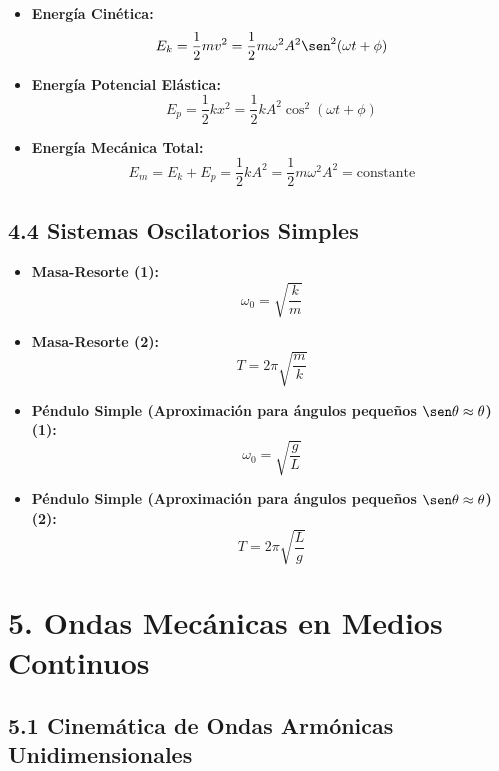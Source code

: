 \documentclass[11pt,a4paper]{article}
\begin{document}
\begin{itemize}
  \item \textbf{Energía Cinética:}
  \[
    E_k = \frac{1}{2} m v^2 = \frac{1}{2} m \omega^2 A^2 \sen^2(\omega t + \phi)
  \]
  \item \textbf{Energía Potencial Elástica:}
  \[
    E_p = \frac{1}{2} k x^2 = \frac{1}{2} k A^2 \cos^2(\omega t + \phi)
  \]
  \item \textbf{Energía Mecánica Total:}
  \[
    E_m = E_k + E_p = \frac{1}{2} k A^2 = \frac{1}{2} m \omega^2 A^2 = \text{constante}
  \]
\end{itemize}

\subsection*{4.4 Sistemas Oscilatorios Simples}

\begin{itemize}
  \item \textbf{Masa-Resorte (1):}
  \[
    \omega_0 = \sqrt{\frac{k}{m}}
  \]
  \item \textbf{Masa-Resorte (2):}
  \[
    T = 2\pi\sqrt{\frac{m}{k}}
  \]
  \item \textbf{Péndulo Simple (Aproximación para ángulos pequeños $\sen\theta \approx \theta$) (1):}
  \[
    \omega_0 = \sqrt{\frac{g}{L}}
  \]
  \item \textbf{Péndulo Simple (Aproximación para ángulos pequeños $\sen\theta \approx \theta$) (2):}
  \[
    T = 2\pi\sqrt{\frac{L}{g}}
  \]
\end{itemize}

\section*{5. Ondas Mecánicas en Medios Continuos}

\subsection*{5.1 Cinemática de Ondas Armónicas Unidimensionales}
\end{document}
